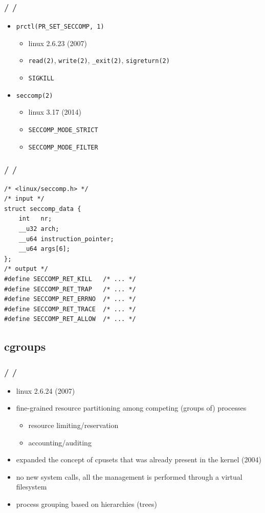 \documentclass{beamer}
\newcommand{\autotitle}
{\frametitle{
    \secname
    \ifx\insertsubsection\empty
    \else
        /\subsecname
        \ifx\insertsubsubsection\empty\else/\subsubsecname\fi
    \fi}}
\begin{document}
\begin{frame}
    \autotitle
    \begin{itemize}
        \item \texttt{prctl(PR\_SET\_SECCOMP, 1)}
        \begin{itemize}
            \item linux 2.6.23 (2007)
            \item
                \texttt{read(2)}, \texttt{write(2)}, \texttt{\_exit(2)},
                \texttt{sigreturn(2)}
            \item \texttt{SIGKILL}
        \end{itemize}
        \item \texttt{seccomp(2)}
        \begin{itemize}
            \item linux 3.17 (2014)
            \item \texttt{SECCOMP\_MODE\_STRICT}
            \item \texttt{SECCOMP\_MODE\_FILTER}
        \end{itemize}
    \end{itemize}
\end{frame}

\begin{frame}[fragile]
    \autotitle
    \begin{verbatim}
/* <linux/seccomp.h> */
/* input */
struct seccomp_data {
    int   nr;
    __u32 arch;
    __u64 instruction_pointer;
    __u64 args[6];
};
/* output */
#define SECCOMP_RET_KILL   /* ... */
#define SECCOMP_RET_TRAP   /* ... */
#define SECCOMP_RET_ERRNO  /* ... */
#define SECCOMP_RET_TRACE  /* ... */
#define SECCOMP_RET_ALLOW  /* ... */
    \end{verbatim}
\end{frame}

\subsection{cgroups}

\begin{frame}
    \autotitle
    \begin{itemize}
        \item linux 2.6.24 (2007)
        \item
            fine-grained resource partitioning among competing (groups of)
            processes
        \begin{itemize}
            \item resource limiting/reservation
            \item accounting/auditing
        \end{itemize}
        \item
            expanded the concept of cpusets that was already present in the
            kernel (2004)
        \item
            no new system calls, all the management is performed through a
            virtual filesystem
        \item process grouping based on hierarchies (trees)
    \end{itemize}
\end{frame}
\end{document}
